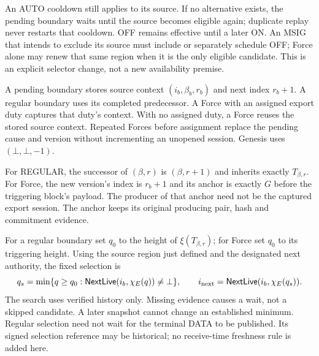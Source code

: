 \documentclass[11pt,a4paper]{article}
\newcommand{\tagg}[1]{\ensuremath{\mathsf{#1}}}
\begin{document}
An AUTO cooldown still applies to its source. If no alternative exists,
the pending boundary waits until the source becomes eligible again;
duplicate replay never restarts that cooldown. OFF remains effective
until a later ON. An MSIG that intends to exclude its source must include
or separately schedule OFF; Force alone may renew that same region when
it is the only eligible candidate. This is an explicit selector change,
not a new availability premise.

A pending boundary stores source context
$(i_b,\beta_b,r_b)$ and next index $r_b+1$. A regular boundary uses
its completed predecessor. A Force with an assigned export duty
captures that duty's context. With no assigned duty, a Force reuses
the stored source context. Repeated Forces before assignment replace
the pending cause and version without incrementing an unopened
session. Genesis uses $(\bot,\bot,-1)$.

For REGULAR, the successor of $(\beta,r)$ is $(\beta,r+1)$ and
inherits exactly $T_{\beta,r}$. For Force, the new version's index is
$r_b+1$ and its anchor is exactly $G$ before the triggering block's
payload. The producer of that anchor need not be the captured export
session. The anchor keeps its original producing pair, hash and
commitment evidence.

For a regular boundary set $q_0$ to the height of
$\xi(T_{\beta,r})$; for Force set $q_0$ to its triggering height.
Using the source region just defined and the designated next authority,
the fixed selection is
\[
 q_s=\min\{q\ge q_0:
 \tagg{NextLive}(i_b,\chi_E(q))\ne\bot\},\qquad
 i_{\rm next}=\tagg{NextLive}(i_b,\chi_E(q_s)).
\]
The search uses verified history only. Missing evidence causes a wait,
not a skipped candidate. A later snapshot cannot change an established
minimum. Regular selection need not wait for the terminal DATA to be
published. Its signed selection reference may be historical; no
receive-time freshness rule is added here.
\end{document}
